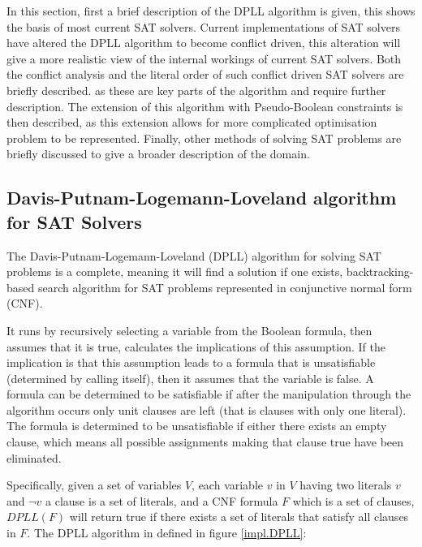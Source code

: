 In this section, first a brief description of the DPLL algorithm is given, this shows the basis of most current SAT solvers.
Current implementations of SAT solvers have altered the DPLL algorithm to become conflict driven,
this alteration will give a more realistic view of the internal workings of current SAT solvers.
Both the conflict analysis and the literal order of such conflict driven SAT solvers are briefly described.
as these are key parts of the algorithm and require further description.
The extension of this algorithm with Pseudo-Boolean constraints is then described,
as this extension allows for more complicated optimisation problem to be represented.
Finally, other methods of solving SAT problems are briefly discussed to give a broader description of the domain. 


\subsection{Davis-Putnam-Logemann-Loveland algorithm for SAT Solvers}
The Davis-Putnam-Logemann-Loveland (DPLL) algorithm \citep{Davis1960, davis1962machine} for solving SAT problems is a complete, meaning it will find a solution if one exists, 
backtracking-based search algorithm for SAT problems represented in conjunctive normal form (CNF).

It runs by recursively selecting a variable from the Boolean formula, then assumes that it is true, calculates the implications of this assumption.
If the implication is that this assumption leads to a formula that is unsatisfiable (determined by calling itself), then it assumes that the variable is false.
A formula can be determined to be satisfiable if after the manipulation through the algorithm occurs only unit clauses are left (that is clauses with only one literal).
The formula is determined to be unsatisfiable if either there exists an empty clause, which means all possible assignments making that clause true have been eliminated.

Specifically, given a set of variables $V$, 
each variable $v$ in $V$ having two literals $v$ and $\neg v$
a clause is a set of literals, 
and a CNF formula $F$ which is a set of clauses,
$DPLL(F)$ will return true if there exists a set of literals that satisfy all clauses in $F$. 
The DPLL algorithm in defined in figure \ref{impl.DPLL}:

